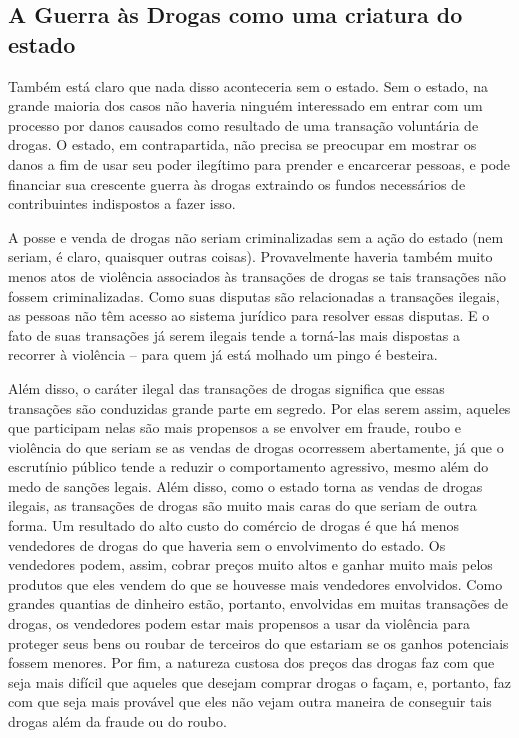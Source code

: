 \subsection*{A Guerra às Drogas como uma criatura do estado}

Também está claro que nada disso aconteceria sem o estado. Sem o estado, na grande maioria dos casos não haveria ninguém interessado em entrar com um processo por danos causados como resultado de uma transação voluntária de drogas. O estado, em contrapartida, não precisa se preocupar em mostrar os danos a fim de usar seu poder ilegítimo para prender e encarcerar pessoas, e pode financiar sua crescente guerra às drogas extraindo os fundos necessários de contribuintes indispostos a fazer isso.

A posse e venda de drogas não seriam criminalizadas sem a ação do estado (nem seriam, é claro, quaisquer outras coisas). Provavelmente haveria também muito menos atos de violência associados às transações de drogas se tais transações não fossem criminalizadas. Como suas disputas são relacionadas a transações ilegais, as pessoas não têm acesso ao sistema jurídico para resolver essas disputas. E o fato de suas transações já serem ilegais tende a torná-las mais dispostas a recorrer à violência -- para quem já está molhado um pingo é besteira.

Além disso, o caráter ilegal das transações de drogas significa que essas transações são conduzidas grande parte em segredo. Por elas serem assim, aqueles que participam nelas são mais propensos a se envolver em fraude, roubo e violência do que seriam se as vendas de drogas ocorressem abertamente, já que o escrutínio público tende a reduzir o comportamento agressivo, mesmo além do medo de sanções legais. Além disso, como o estado torna as vendas de drogas ilegais, as transações de drogas são muito mais caras do que seriam de outra forma. Um resultado do alto custo do comércio de drogas é que há menos vendedores de drogas do que haveria sem o envolvimento do estado. Os vendedores podem, assim, cobrar preços muito altos e ganhar muito mais pelos produtos que eles vendem do que se houvesse mais vendedores envolvidos. Como grandes quantias de dinheiro estão, portanto, envolvidas em muitas transações de drogas, os vendedores podem estar mais propensos a usar da violência para proteger seus bens ou roubar de terceiros do que estariam se os ganhos potenciais fossem menores. Por fim, a natureza custosa dos preços das drogas faz com que seja mais difícil que aqueles que desejam comprar drogas o façam, e, portanto, faz com que seja mais provável que eles não vejam outra maneira de conseguir tais drogas além da fraude ou do roubo.

